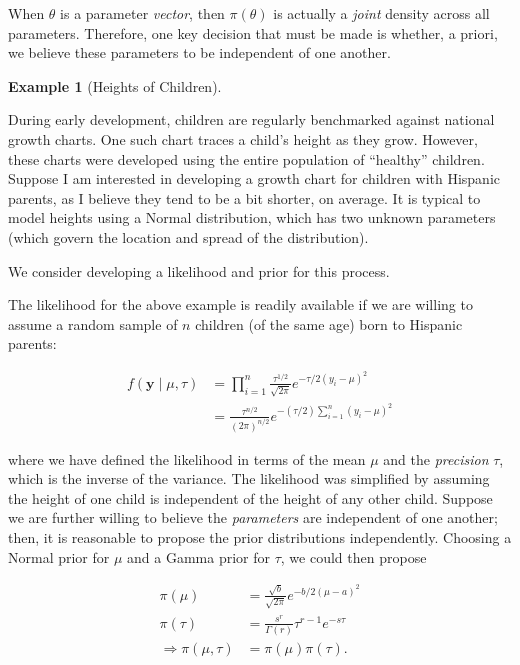 \documentclass[
  letterpaper,
  DIV=11,
  numbers=noendperiod]{scrreprt}
\theoremstyle{definition}
\newtheorem{example}{Example}[chapter]
\theoremstyle{definition}
\theoremstyle{plain}
\theoremstyle{remark}
\begin{document}
When \(\theta\) is a parameter \emph{vector}, then \(\pi(\theta)\) is
actually a \emph{joint} density across all parameters. Therefore, one
key decision that must be made is whether, a priori, we believe these
parameters to be independent of one another.

\begin{example}[Heights of
Children]\protect\hypertarget{exm-heights}{}\label{exm-heights}

During early development, children are regularly benchmarked against
national growth charts. One such chart traces a child's height as they
grow. However, these charts were developed using the entire population
of ``healthy'' children. Suppose I am interested in developing a growth
chart for children with Hispanic parents, as I believe they tend to be a
bit shorter, on average. It is typical to model heights using a Normal
distribution, which has two unknown parameters (which govern the
location and spread of the distribution).

We consider developing a likelihood and prior for this process.

\end{example}

The likelihood for the above example is readily available if we are
willing to assume a random sample of \(n\) children (of the same age)
born to Hispanic parents:

\[
\begin{aligned}
  f(\mathbf{y} \mid \mu, \tau) 
    &= \prod_{i=1}^{n} \frac{\tau^{1/2}}{\sqrt{2\pi}} e^{-\tau/2 (y_i - \mu)^2} \\
    &= \frac{\tau^{n/2}}{(2\pi)^{n/2}} e^{-(\tau/2)\sum_{i=1}^{n}(y_i - \mu)^2}
\end{aligned}
\]

where we have defined the likelihood in terms of the mean \(\mu\) and
the \emph{precision} \(\tau\), which is the inverse of the variance. The
likelihood was simplified by assuming the height of one child is
independent of the height of any other child. Suppose we are further
willing to believe the \emph{parameters} are independent of one another;
then, it is reasonable to propose the prior distributions independently.
Choosing a Normal prior for \(\mu\) and a Gamma prior for \(\tau\), we
could then propose

\[
\begin{aligned}
  \pi(\mu) &= \frac{\sqrt{b}}{\sqrt{2\pi}} e^{-b/2 (\mu - a)^2} \\
  \pi(\tau) &= \frac{s^r}{\Gamma(r)} \tau^{r - 1} e^{-s\tau} \\
  \Rightarrow \pi(\mu, \tau) &= \pi(\mu) \pi(\tau).
\end{aligned}
\]
\end{document}
